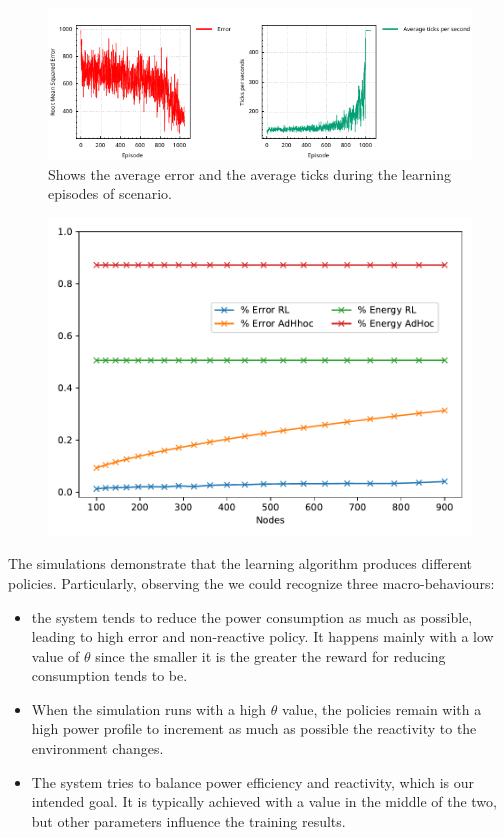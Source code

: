 \begin{figure}
    \centering
    \includegraphics[width=\textwidth]{papers/acsos2022/img//error-and-ticks.pdf}
    \caption{Shows the average error and the average ticks during the learning episodes of \swapscen{} scenario. }
    \label{acsos2022:fig:training-performance}
 \end{figure}
 \begin{figure}
    \centering
    \includegraphics[width=0.8\linewidth]{papers/acsos2022/img//plain-gradient.pdf}
    \caption[Error and energy saving percentage (see ) as nodes vary.]{}
    \label{acsos2022:fig:check-scale}
 \end{figure}
The simulations demonstrate 
 that the learning algorithm produces different policies. 
 Particularly, observing the  we could recognize three macro-behaviours:
\begin{itemize}
    \item the system tends to reduce the power consumption as much as possible, 
     leading to high error and non-reactive policy. 
     It happens mainly with a low value of $\theta$ since the smaller it is 
     the greater the reward for reducing consumption tends to be.
    \item When the simulation runs with a high $\theta$ value, 
    the policies remain with a high power profile to increment 
    as much as possible the reactivity to the environment changes. 
    \item The system tries to balance power efficiency and reactivity, 
    which is our intended goal. 
    It is typically achieved with a value in the middle of the two, 
    but other parameters influence the training results.
\end{itemize}

